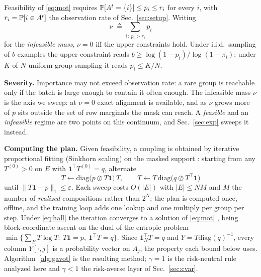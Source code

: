\begin{corollary}
\label{cor:batchsize}
Feasibility of \eqref{eq:mot} requires $\mathbb{P}[A^t=\{i\}]\le p_i\le r_i$ for every
$i$, with $r_i=\mathbb{P}[i\in A^t]$ the observation rate of Sec.~\ref{sec:setup}.
Writing
\begin{equation}
\nu\;\triangleq\!\!\sum_{i\,:\,p_i>r_i}\!\! p_i
\label{eq:batchlaw}
\end{equation}
for the \emph{infeasible mass}, $\nu=0$ iff the upper constraints hold.
Under i.i.d.\ sampling of $b$ examples the upper constraint reads
$b\ge\log(1-p_i)/\log(1-\pi_i)$; under $K$-of-$N$ uniform group sampling it
reads $p_i\le K/N$.
\end{corollary}
\noindent\textbf{Severity.}
Importance may not exceed observation rate: a rare group is reachable only
if the batch is large enough to contain it often enough. The infeasible mass
$\nu$ is the axis we sweep: at $\nu=0$ exact alignment is available, and as
$\nu$ grows more of $p$ sits outside the set of row marginals the mask can
reach. A \emph{feasible} and an \emph{infeasible} regime are two points on
this continuum, and Sec.~\ref{sec:exp} sweeps it instead.

\noindent\textbf{Computing the plan.}
Given feasibility, a coupling is obtained by iterative proportional fitting
(Sinkhorn scaling) on the masked support
\cite{sinkhorn1967,cuturi2013,peyre2019}: starting from any $T^{(0)}>0$ on
$E$ with $\mathbf{1}^\top T^{(0)}=q$, alternate
\begin{equation}
T\leftarrow\mathrm{diag}\big(p\oslash T\mathbf{1}\big)\,T,\qquad
T\leftarrow T\,\mathrm{diag}\big(q\oslash T^\top\mathbf{1}\big)
\label{eq:ipfp}
\end{equation}
until $\|T\mathbf{1}-p\|_1\le\varepsilon$. Each sweep costs $O(|E|)$ with
$|E|\le NM$ and $M$ the number of \emph{realized} compositions rather than
$2^N$; the plan is computed once, offline, and the training loop adds one
lookup and one multiply per group per step. Under \eqref{eq:hall} the
iteration converges to a solution of \eqref{eq:mot}
\cite{sinkhorn1967,csiszar1975}, being block-coordinate ascent on the dual of
the entropic problem $\min\{\sum_E T\log T:\ T\mathbf{1}=p,\ \mathbf{1}^\top T=q\}$.
Since $\mathbf{1}_N^\top T=q$ and $Y=T\mathrm{diag}(q)^{-1}$, every column
$Y[\cdot,j]$ is a probability vector on $A_j$, the property each bound below
uses. Algorithm~\ref{alg:gavot} is the resulting method; $\gamma=1$ is the
risk-neutral rule analyzed here and $\gamma<1$ the risk-averse layer of
Sec.~\ref{sec:cvar}.

